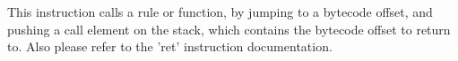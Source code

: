 This instruction calls a rule or function, by jumping to a bytecode
offset, and pushing a call element on the stack, which contains the
bytecode offset to return to. Also please refer to the 'ret'
instruction documentation.
